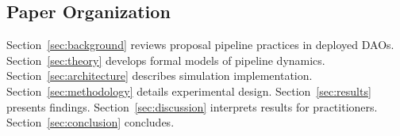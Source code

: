 \subsection{Paper Organization}

Section~\ref{sec:background} reviews proposal pipeline practices in deployed DAOs. Section~\ref{sec:theory} develops formal models of pipeline dynamics. Section~\ref{sec:architecture} describes simulation implementation. Section~\ref{sec:methodology} details experimental design. Section~\ref{sec:results} presents findings. Section~\ref{sec:discussion} interprets results for practitioners. Section~\ref{sec:conclusion} concludes.
